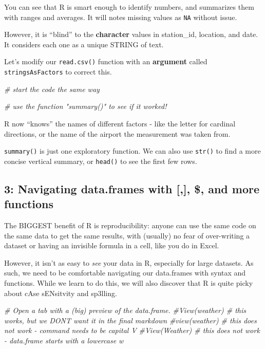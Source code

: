 \documentclass[
]{article}
\newenvironment{Shaded}{\begin{snugshade}}{\end{snugshade}}
\newcommand{\CommentTok}[1]{\textcolor[rgb]{0.56,0.35,0.01}{\textit{#1}}}
\begin{document}
You can see that R is smart enough to identify numbers, and summarizes
them with ranges and averages. It will notes missing values as
\texttt{NA} without issue.

However, it is ``blind'' to the \textbf{character} values in
station\_id, location, and date. It considers each one as a unique
STRING of text.

Let's modify our \texttt{read.csv()} function with an \textbf{argument}
called \texttt{stringsAsFactors} to correct this.

\begin{Shaded}
\begin{Highlighting}[]
\CommentTok{\# start the code the same way}

\CommentTok{\# use the function "summary()" to see if it worked!}
\end{Highlighting}
\end{Shaded}

R now ``knows'' the names of different factors - like the letter for
cardinal directions, or the name of the airport the measurement was
taken from.

\texttt{summary()} is just one exploratory function. We can also use
\texttt{str()} to find a more concise vertical summary, or
\texttt{head()} to see the first few rows.

\subsection{3: Navigating data.frames with {[},{]}, \$, and more
functions}\label{navigating-data.frames-with-and-more-functions}

The BIGGEST benefit of R is reproducibility: anyone can use the same
code on the same data to get the same results, with (usually) no fear of
over-writing a dataset or having an invisible formula in a cell, like
you do in Excel.

However, it isn't as easy to \emph{see} your data in R, especially for
large datasets. As such, we need to be comfortable navigating our
data.frames with syntax and functions. While we learn to do this, we
will also discover that R is quite picky about cAse sENsitvity and
sp3lling.

\begin{Shaded}
\begin{Highlighting}[]
\CommentTok{\# Open a tab with a (big) preview of the data.frame.}
\CommentTok{\#View(weather) \# this works, but we DON\textquotesingle{}T want it in the final markdown}
\CommentTok{\#view(weather) \# this does not work {-} command needs to be capital V}
\CommentTok{\#View(Weather) \# this does not work {-} data.frame starts with a lowercase w}
\end{Highlighting}
\end{Shaded}
\end{document}
